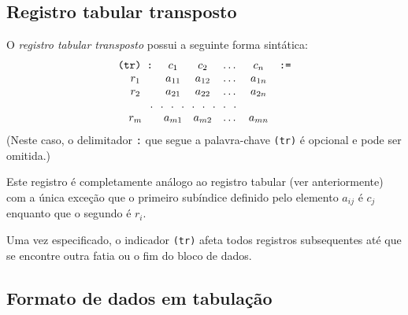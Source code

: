 \documentclass[11pt, brazil]{report}
\begin{document}
\subsection{Registro tabular transposto}

O {\it registro tabular transposto} possui a seguinte forma sintática:
$$\begin{array}{cccccc}
\mbox{{\tt(tr) :}}&c_1&c_2&\dots&c_n&\mbox{{\tt:=}}\\
r_1&a_{11}&a_{12}&\dots&a_{1n}&\\
r_2&a_{21}&a_{22}&\dots&a_{2n}&\\
\multicolumn{5}{c}{.\ \ .\ \ .\ \ .\ \ .\ \ .\ \ .\ \ .\ \ .}&\\
r_m&a_{m1}&a_{m2}&\dots&a_{mn}&\\
\end{array}$$
(Neste caso, o delimitador {\tt:} que segue a palavra-chave {\tt(tr)} é
opcional e pode ser omitida.)

Este registro é completamente análogo ao registro tabular
(ver anteriormente) com a única exceção que o primeiro subíndice definido
pelo elemento $a_{ij}$ é $c_j$ enquanto que o segundo é $r_i$.

Uma vez especificado, o indicador {\tt(tr)} afeta todos registros subsequentes
até que se encontre outra fatia ou o fim do bloco de dados.


%
%


\subsection{Formato de dados em tabulação}
\end{document}
